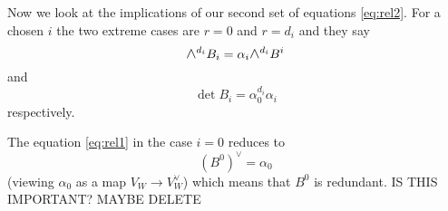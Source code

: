 \documentclass{amsart}
\theoremstyle{definition}
\newcommand{\Wedge}{\mbox{\scalebox{1.2}{$\wedge$}}}
\newcommand\VW{V_W}
\begin{document}
Now we look at the implications of our second set of equations \eqref{eq:rel2}. For a chosen $i$ the two extreme cases are $r=0$ and $r=d_i$ and they say
\begin{equation}\label{eq:r=0}\Wedge^{d_i} B_i = \alpha_i\Wedge^{d_i} B^i 
\end{equation}
and
\begin{equation}\label{eq:r=di} \det B_i = \alpha_0^{d_i}\alpha_i
\end{equation}
respectively. 

The equation \eqref{eq:rel1} in the case $i=0$ reduces to 
$$ (B^0)^\vee = \alpha_0 $$
(viewing $\alpha_0$ as a map $\VW\to \VW^\vee$) which means that $B^0$ is redundant. IS THIS IMPORTANT? MAYBE DELETE

\end{document}
